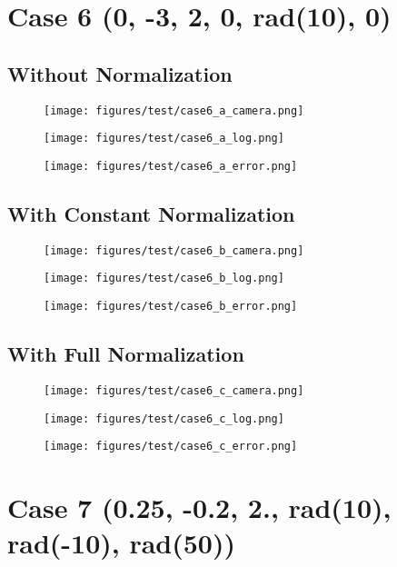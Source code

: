 \section{Case 6 (0, -3, 2, 0, rad(10), 0)}
\subsection{Without Normalization}
\begin{figure}[ht!] \centering \texttt{[image: figures/test/case6\_a\_camera.png]} \end{figure}
\begin{figure}[ht!] \centering \texttt{[image: figures/test/case6\_a\_log.png]} \end{figure}
\begin{figure}[ht!] \centering \texttt{[image: figures/test/case6\_a\_error.png]} \end{figure}
\clearpage
\subsection{With Constant Normalization}
\begin{figure}[ht!] \centering \texttt{[image: figures/test/case6\_b\_camera.png]} \end{figure}
\begin{figure}[ht!] \centering \texttt{[image: figures/test/case6\_b\_log.png]} \end{figure}
\begin{figure}[ht!] \centering \texttt{[image: figures/test/case6\_b\_error.png]} \end{figure}
\clearpage
\subsection{With Full Normalization}
\begin{figure}[ht!] \centering \texttt{[image: figures/test/case6\_c\_camera.png]} \end{figure}
\begin{figure}[ht!] \centering \texttt{[image: figures/test/case6\_c\_log.png]} \end{figure}
\begin{figure}[ht!] \centering \texttt{[image: figures/test/case6\_c\_error.png]} \end{figure}
\clearpage

\section{Case 7 (0.25, -0.2, 2., rad(10), rad(-10), rad(50))}
